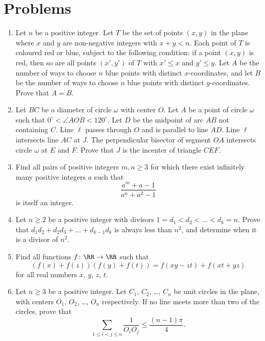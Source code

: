 \documentclass[11pt]{scrartcl}
\begin{document}
\section{Problems}
\begin{enumerate}[\bfseries 1.]
\item %
Let $n$ be a positive integer.
Let $T$ be the set of points $(x,y)$ in the plane
where $x$ and $y$ are non-negative integers with $x+y<n$.
Each point of $T$ is coloured red or blue,
subject to the following condition:
if a point $(x,y)$ is red,
then so are all points $(x',y')$ of $T$
with $x'\leq x$ and $y'\leq y$.
Let $A$ be the number of ways to choose $n$ blue points
with distinct $x$-coordinates,
and let $B$ be the number of ways to choose $n$ blue
points with distinct $y$-coordinates.
Prove that $A=B$.

\item %
Let $BC$ be a diameter of circle $\omega$ with center $O$. Let $A$ be a point
of circle $\omega$ such that $0^\circ < \angle AOB < 120^\circ$. Let $D$ be the midpoint
of arc $AB$ not containing $C$. Line $\ell$ passes through $O$ and is
parallel to line $AD$. Line $\ell$ intersects line $AC$ at $J$.
The perpendicular bisector of segment $OA$ intersects circle $\omega$ at $E$
and $F$. Prove that $J$ is the incenter of triangle $CEF$.

\item %
Find all pairs of positive integers
$m, n \ge 3$ for which there exist infinitely many
positive integers $a$ such that
\[ \frac{a^m+a-1}{a^n+a^2-1} \]
is itself an integer.

\item %
Let $n \ge 2$ be a positive integer
with divisors $1 = d_1 < d_2 < \dots < d_k = n$.
Prove that $d_1d_2 + d_2d_3 + \dots + d_{k-1} d_k$ is always less than $n^2$,
and determine when it is a divisor of $n^2$.

\item %
Find all functions $f \colon \RR \to \RR$ such that
\[ \left(f(x)+f(z)\right)\left(f(y)+f(t)\right)
  = f(xy-zt)+f(xt+yz) \]
for all real numbers $x$, $y$, $z$, $t$.

\item %
Let $n \ge 3$ be a positive integer.
Let $C_1$, $C_2$, \dots, $C_n$ be unit circles in the plane,
with centers $O_1$, $O_2$, \dots, $O_n$ respectively.
If no line meets more than two of the circles, prove that
\[ \sum_{1 \le i < j \le n } \frac{1}{O_i O_j}
  \le \frac{(n-1)\pi}{4}. \]

\end{enumerate}
\pagebreak
\end{document}

